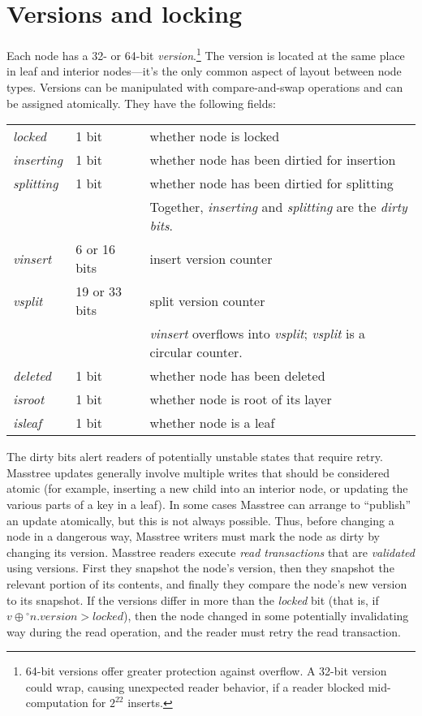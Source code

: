 \documentclass[11pt]{article}
\newcommand{\V}[1]{\textit{#1}}
\newcommand{\readnow}[1]{\ensuremath{{}^\circ#1}}
\begin{document}
\section{Versions and locking}

Each node has a 32- or 64-bit \emph{version}.\footnote{64-bit versions
offer greater protection against overflow. A 32-bit version could wrap,
causing unexpected reader behavior, if a reader blocked mid-computation
for \(2^{22}\) inserts.} The version is located at the same place in
leaf and interior nodes---it's the only common aspect of layout between
node types. Versions can be manipulated with compare-and-swap operations
and can be assigned atomically. They have the following fields:

\begin{flushleft}
\begin{tabular}{@{}lll}
\V{locked} & 1 bit & whether node is locked \\
\V{inserting} & 1 bit & whether node has been dirtied for insertion \\
\V{splitting} & 1 bit & whether node has been dirtied for splitting \\
&& Together, \V{inserting} and \V{splitting} are the \emph{dirty bits}. \\
\V{vinsert} & 6 or 16 bits & insert version counter \\
\V{vsplit} & 19 or 33 bits & split version counter \\
&& \V{vinsert} overflows into \V{vsplit}; \V{vsplit} is a circular
counter. \\
\V{deleted} & 1 bit & whether node has been deleted \\
\V{isroot} & 1 bit & whether node is root of its layer \\
\V{isleaf} & 1 bit & whether node is a leaf \\
\end{tabular}
\end{flushleft}

The dirty bits alert readers of potentially unstable states that require
retry. Masstree updates generally involve multiple writes that should be
considered atomic (for example, inserting a new child into an interior
node, or updating the various parts of a key in a leaf). In some cases
Masstree can arrange to ``publish'' an update atomically,
but this is not always possible. Thus,
before changing a node in a dangerous way, Masstree writers must mark
the node as dirty by changing its version. Masstree readers execute
\emph{read transactions} that are \emph{validated} using versions. First
they snapshot the node's version, then they snapshot the relevant
portion of its contents, and finally they compare the node's new version
to its snapshot. If the versions differ in more than the \V{locked}
bit (that is, if \(v \oplus \readnow{n.\V{version}} > \V{locked}\)),
then the node changed in some potentially invalidating way during the
read operation, and the reader must retry the read transaction.
\end{document}
